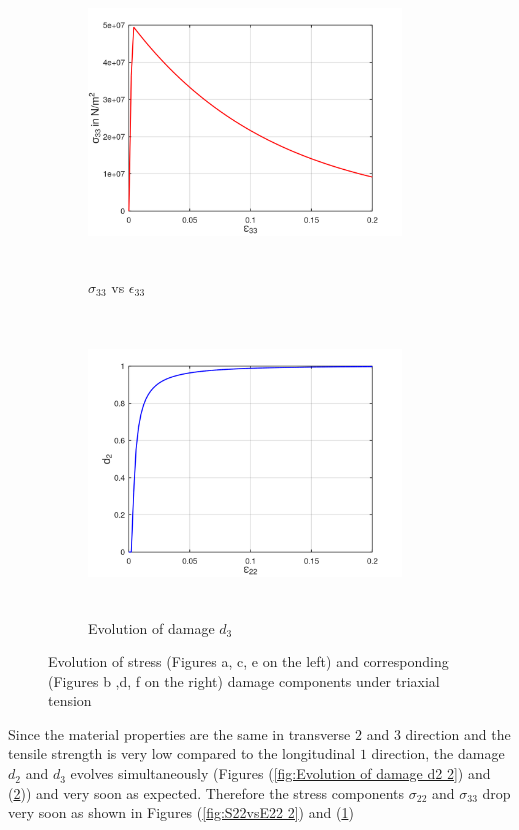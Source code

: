 \documentclass[12pt,a4paper,twoside,openright]{report}
\begin{document}
\begin{figure}[htbp!]\ContinuedFloat
     \begin{subfigure}{0.4\textwidth}
         \includegraphics[width=8.3cm,height=8cm,keepaspectratio]{24.S33vsE33.png}
         \caption{$\sigma_{33}$ vs $\epsilon_{33}$}
         \label{fig:S33vsE33}
     \end{subfigure}
     \hspace{1.8cm}
     \begin{subfigure}{0.4\textwidth}
         \includegraphics[width=8.3cm,height=8cm,keepaspectratio]{24.d2.png}
         \caption{Evolution of damage $d_{3}$}
         \label{fig:Evolution of damage d3}
     \end{subfigure}     
        \caption{Evolution of stress (Figures a, c, e on the left) and corresponding (Figures b ,d, f on the right) damage components under triaxial tension}
        \label{fig:Evolution of damage under triaxial tension}     
\end{figure}
\FloatBarrier
Since the material properties are the same in transverse $2$ and $3$ direction and the tensile strength is very low compared to the longitudinal $1$ direction, the damage $d_{2}$ and $d_{3}$ evolves simultaneously (Figures (\ref{fig:Evolution of damage d2 2}) and (\ref{fig:Evolution of damage d3})) and very soon as expected. Therefore the stress components $\sigma_{22}$ and $\sigma_{33}$ drop very soon as shown in Figures (\ref{fig:S22vsE22 2}) and (\ref{fig:S33vsE33}) 
\end{document}

